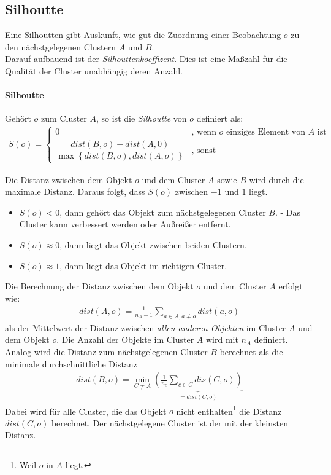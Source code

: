 \subsection{Silhoutte}
Eine Silhoutten gibt Auskunft, wie gut die Zuordnung einer Beobachtung $o$ zu den nächstgelegenen Clustern $A$ und $B$.\\

Darauf aufbauend ist der \textit{Silhouttenkoeffizent}. Dies ist eine Maßzahl für die Qualität der Cluster unabhängig deren Anzahl.

\paragraph{Silhoutte}
Gehört $o$ zum Cluster $A$, so ist die \textit{Silhoutte} von $o$ definiert als: 
\begin{align}
	S(o)= \begin{cases}
		0 & \text{, wenn $o$ einziges Element von $A$ ist} \\
		\dfrac{dist(B,o) - dist(A,0)}{\max\left\lbrace dist(B,o),dist(A,o)\right\rbrace} & \text{, sonst}
	\end{cases}
\end{align}

Die Distanz zwischen dem Objekt $o$ und dem Cluster $A$ sowie $B$ wird durch die maximale Distanz. Daraus folgt, dass $S(o)$ zwischen $-1$ und $1$ liegt.

\begin{itemize}
	\item $S(o) < 0$, dann gehört das Objekt zum nächstgelegenen Cluster $B$. - Das Cluster kann verbessert werden oder Außreißer entfernt.
	\item $S(o) \approx 0$, dann liegt das Objekt zwischen beiden Clustern.
	\item $S(o) \approx 1$, dann liegt das Objekt im richtigen Cluster.
\end{itemize}

Die Berechnung der Distanz zwischen dem Objekt $o$ und dem Cluster $A$ erfolgt wie:
\begin{align}
	dist(A,o) = \frac{1}{n_A - 1}\sum_{a\in A, a \neq o} dist(a,o)
\end{align}
als der Mittelwert der Distanz zwischen \textit{allen anderen Objekten} im Cluster $A$ und dem Objekt $o$. Die Anzahl der Objekte im Cluster $A$ wird mit $n_A$ definiert.\\

Analog wird die Distanz zum nächstgelegenen Cluster $B$ berechnet als die minimale durchschnittliche Distanz
\begin{align}
	dist(B,o) = \min_{C\neq A} \underbrace{\left(\frac{1}{n_c} \sum_{c\in C}dis(C,o)\right)}_{=dist(C,o)}
\end{align}
Dabei wird für alle Cluster, die das Objekt $o$ nicht enthalten\footnote{Weil $o$ in $A$ liegt.} die Distanz $dist(C,o)$ berechnet. Der nächstgelegene Cluster ist der mit der kleinsten Distanz.

